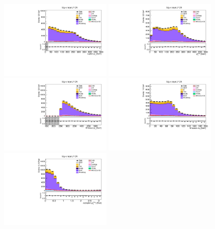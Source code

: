 \begin{figure}[tbp]
  \begin{center}
    \includegraphics[width=0.48\textwidth]{figures/wlnhbb2016/boosted/WmnWHLightFlavorFJCR_lepton1Pt.pdf}
    \includegraphics[width=0.48\textwidth]{figures/wlnhbb2016/boosted/WmnWHLightFlavorFJCR_pfmet.pdf}
    \includegraphics[width=0.48\textwidth]{figures/wlnhbb2016/boosted/WmnWHLightFlavorFJCR_topWBosonPt.pdf}
    \includegraphics[width=0.48\textwidth]{figures/wlnhbb2016/boosted/WmnWHLightFlavorFJCR_mT.pdf}
    \includegraphics[width=0.48\textwidth]{figures/wlnhbb2016/boosted/WmnWHLightFlavorFJCR_deltaPhiLep1Met.pdf}

\end{center}
\end{figure}
